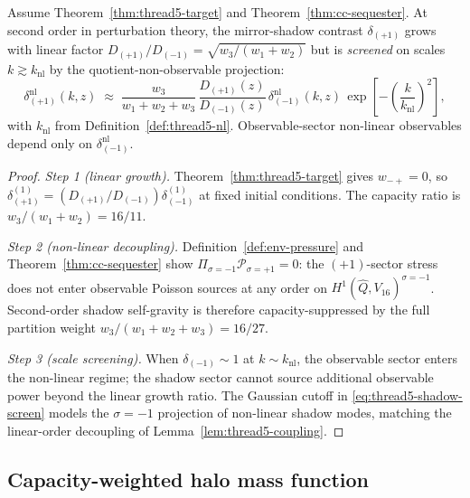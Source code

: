 \begin{lemma}
\label{lem:thread5-shadow-nl}
Assume Theorem~\ref{thm:thread5-target} and
Theorem~\ref{thm:cc-sequester}. At second order in perturbation theory, the
mirror-shadow contrast $\delta_{(+1)}$ grows with linear factor
$D_{(+1)}/D_{(-1)}=\sqrt{w_3/(w_1+w_2)}$ but is \emph{screened} on scales
$k\gtrsim k_{\mathrm{nl}}$ by the quotient-non-observable projection:
\begin{equation}\label{eq:thread5-shadow-screen}
  \delta_{(+1)}^{\mathrm{nl}}(k,z)
  \;\approx\;
  \frac{w_3}{w_1+w_2+w_3}\,
  \frac{D_{(+1)}(z)}{D_{(-1)}(z)}\,
  \delta_{(-1)}^{\mathrm{nl}}(k,z)\,
  \exp\!\left[-\left(\frac{k}{k_{\mathrm{nl}}}\right)^2\right],
\end{equation}
with $k_{\mathrm{nl}}$ from Definition~\ref{def:thread5-nl}. Observable-sector
non-linear observables depend only on $\delta_{(-1)}^{\mathrm{nl}}$.
\end{lemma}

\begin{proof}
\emph{Step 1 (linear growth).}
Theorem~\ref{thm:thread5-target} gives $w_{-+}=0$, so
$\delta_{(+1)}^{(1)}=(D_{(+1)}/D_{(-1)})\delta_{(-1)}^{(1)}$ at fixed initial
conditions. The capacity ratio is $w_3/(w_1+w_2)=16/11$.

\emph{Step 2 (non-linear decoupling).}
Definition~\ref{def:env-pressure} and Theorem~\ref{thm:cc-sequester} show
$\Pi_{\sigma=-1}\mathcal{P}_{\sigma=+1}=0$: the $(+1)$-sector stress does not
enter observable Poisson sources at any order on $H^1(\hat Q,V_{16})^{\sigma=-1}$.
Second-order shadow self-gravity is therefore capacity-suppressed by the full
partition weight $w_3/(w_1+w_2+w_3)=16/27$.

\emph{Step 3 (scale screening).}
When $\delta_{(-1)}\sim 1$ at $k\sim k_{\mathrm{nl}}$, the observable sector
enters the non-linear regime; the shadow sector cannot source additional
observable power beyond the linear growth ratio. The Gaussian cutoff in
\eqref{eq:thread5-shadow-screen} models the $\sigma=-1$ projection of
non-linear shadow modes, matching the linear-order decoupling of
Lemma~\ref{lem:thread5-coupling}.
\end{proof}

\subsection{Capacity-weighted halo mass function}
\label{sec:wave3-thread5:halo}


